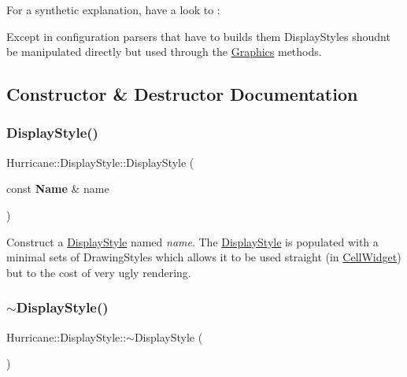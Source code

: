 For a synthetic explanation, have a look to \+:

Except in configuration parsers that have to builds them Display\+Styles shoudn\textquotesingle{}t be manipulated directly but used through the \mbox{\hyperlink{classHurricane_1_1Graphics}{Graphics}} methods. 

\subsection{Constructor \& Destructor Documentation}
\mbox{\label{classHurricane_1_1DisplayStyle_ac2923e24d8a17aba8f83803a807058bd}} 
\subsubsection{\texorpdfstring{Display\+Style()}{DisplayStyle()}}
{\footnotesize\ttfamily Hurricane\+::\+Display\+Style\+::\+Display\+Style (\begin{DoxyParamCaption}\item[{const \textbf{ Name} \&}]{name }\end{DoxyParamCaption})}

Construct a \mbox{\hyperlink{classHurricane_1_1DisplayStyle}{Display\+Style}} named {\itshape name}. The \mbox{\hyperlink{classHurricane_1_1DisplayStyle}{Display\+Style}} is populated with a minimal sets of Drawing\+Styles which allows it to be used straight (in \mbox{\hyperlink{classHurricane_1_1CellWidget}{Cell\+Widget}}) but to the cost of very ugly rendering. \mbox{\label{classHurricane_1_1DisplayStyle_ada5e04aa32eba45ff5c7567cd432f0e7}} 
\subsubsection{\texorpdfstring{$\sim$\+Display\+Style()}{~DisplayStyle()}}
{\footnotesize\ttfamily Hurricane\+::\+Display\+Style\+::$\sim$\+Display\+Style (\begin{DoxyParamCaption}{ }\end{DoxyParamCaption})}

